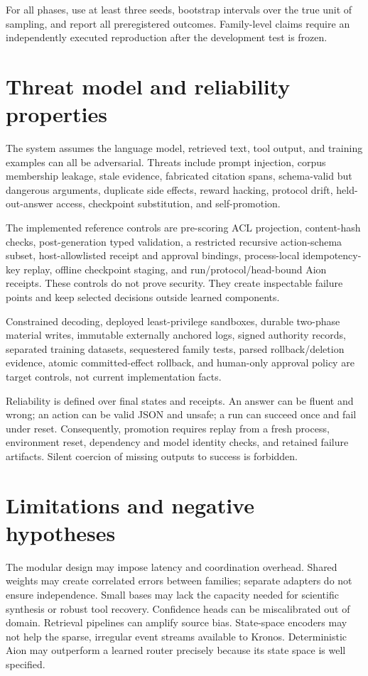 \documentclass[10pt]{article}
\begin{document}
For all phases, use at least three seeds, bootstrap intervals over the true unit
of sampling, and report all preregistered outcomes. Family-level claims require
an independently executed reproduction after the development test is frozen.

\section{Threat model and reliability properties}

The system assumes the language model, retrieved text, tool output, and training
examples can all be adversarial. Threats include prompt injection, corpus
membership leakage, stale evidence, fabricated citation spans, schema-valid but
dangerous arguments, duplicate side effects, reward hacking, protocol drift,
held-out-answer access, checkpoint substitution, and self-promotion.

The implemented reference controls are pre-scoring ACL projection,
content-hash checks, post-generation typed validation, a restricted recursive
action-schema subset, host-allowlisted receipt and approval bindings,
process-local idempotency-key replay, offline checkpoint staging, and
run/protocol/head-bound Aion receipts. These controls do not prove security.
They create inspectable failure points and keep selected decisions outside
learned components.

Constrained decoding, deployed least-privilege sandboxes, durable two-phase
material writes, immutable externally anchored logs, signed authority records,
separated training datasets, sequestered family tests, parsed rollback/deletion
evidence, atomic committed-effect rollback, and human-only approval policy are
target controls, not current implementation facts.

Reliability is defined over final states and receipts. An answer can be fluent
and wrong; an action can be valid JSON and unsafe; a run can succeed once and
fail under reset. Consequently, promotion requires replay from a fresh process,
environment reset, dependency and model identity checks, and retained failure
artifacts. Silent coercion of missing outputs to success is forbidden.

\section{Limitations and negative hypotheses}

The modular design may impose latency and coordination overhead. Shared weights
may create correlated errors between families; separate adapters do not ensure
independence. Small bases may lack the capacity needed for scientific synthesis
or robust tool recovery. Confidence heads can be miscalibrated out of domain.
Retrieval pipelines can amplify source bias. State-space encoders may not help
the sparse, irregular event streams available to Kronos. Deterministic Aion may
outperform a learned router precisely because its state space is well specified.
\end{document}
